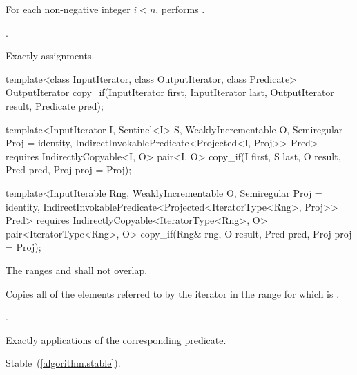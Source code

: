 \begin{itemdescr}
\pnum
\effects For each non-negative integer
$i < n$, performs .

\pnum
\returns {}.

\pnum
\complexity Exactly  assignments.
\end{itemdescr}

%
\begin{removedblock}
\begin{itemdecl}
template<class InputIterator, class OutputIterator, class Predicate>
  OutputIterator copy_if(InputIterator first, InputIterator last,
                         OutputIterator result, Predicate pred);
\end{itemdecl}
\end{removedblock}
\begin{addedblock}
\begin{itemdecl}
template<InputIterator I, Sentinel<I> S, WeaklyIncrementable O, Semiregular Proj = identity,
    IndirectInvokablePredicate<Projected<I, Proj>> Pred>
  requires IndirectlyCopyable<I, O>
  pair<I, O>
    copy_if(I first, S last, O result, Pred pred, Proj proj = Proj{});

template<InputIterable Rng, WeaklyIncrementable O, Semiregular Proj = identity,
    IndirectInvokablePredicate<Projected<IteratorType<Rng>, Proj>> Pred>
  requires IndirectlyCopyable<IteratorType<Rng>, O>
  pair<IteratorType<Rng>, O>
    copy_if(Rng& rng, O result, Pred pred, Proj proj = Proj{});
\end{itemdecl}
\end{addedblock}

\begin{itemdescr}
\pnum
\requires The ranges  and  shall not overlap.

\pnum
\effects Copies all of the elements referred to by the iterator  in the range 
for which  is .

\pnum
\returns {}.

\pnum
\complexity Exactly  applications of the corresponding predicate.

\pnum
\remarks Stable~(\ref{algorithm.stable}).
\end{itemdescr}


